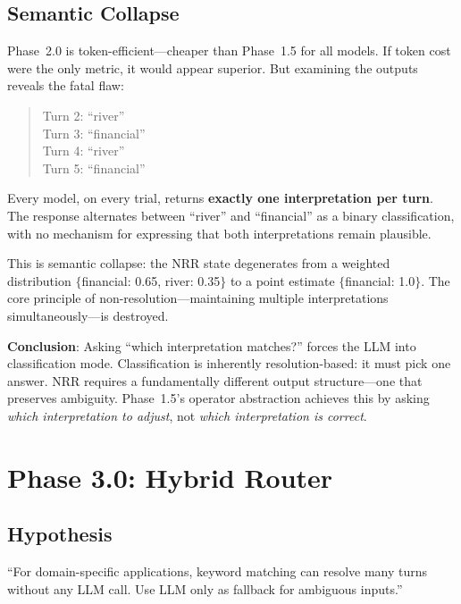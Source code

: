 \documentclass[11pt,a4paper]{article}
\begin{document}
\subsection{Semantic Collapse}

Phase~2.0 is token-efficient---cheaper than Phase~1.5 for all models. If token
cost were the only metric, it would appear superior. But examining the outputs
reveals the fatal flaw:

\begin{quote}
Turn 2: ``river'' \\
Turn 3: ``financial'' \\
Turn 4: ``river'' \\
Turn 5: ``financial''
\end{quote}

Every model, on every trial, returns \textbf{exactly one interpretation per turn}.
The response alternates between ``river'' and ``financial'' as a binary
classification, with no mechanism for expressing that both interpretations remain
plausible.

This is semantic collapse: the NRR state degenerates from a weighted distribution
$\{$financial: 0.65, river: 0.35$\}$ to a point estimate $\{$financial: 1.0$\}$.
The core principle of non-resolution---maintaining multiple interpretations
simultaneously---is destroyed.

\textbf{Conclusion}: Asking ``which interpretation matches?'' forces the LLM into
classification mode. Classification is inherently resolution-based: it must pick
one answer. NRR requires a fundamentally different output structure---one that
preserves ambiguity. Phase~1.5's operator abstraction achieves this by asking
\textit{which interpretation to adjust}, not \textit{which interpretation is
correct}.

\section{Phase 3.0: Hybrid Router}
\label{sec:phase3_0}

\subsection{Hypothesis}

``For domain-specific applications, keyword matching can resolve many turns
without any LLM call. Use LLM only as fallback for ambiguous inputs.''
\end{document}
